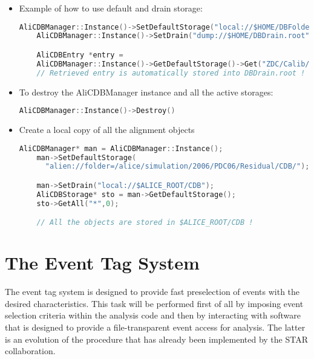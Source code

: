 \documentclass[12pt,a4paper,twoside]{article}
\begin{document}
{\begin{itemize}
  \begin{lstlisting}[language=C++]
    Bool_t 	IsDefaultStorageSet()
    void	RemoveDefaultStorage()
    Bool_t 	IsDrainSet()
    void	RemoveDrain()
  \end{lstlisting}

\item Example of how to use default and drain storage:

  \begin{lstlisting}[language=C++]
    AliCDBManager::Instance()->SetDefaultStorage("local://$HOME/DBFolder");
    AliCDBManager::Instance()->SetDrain("dump://$HOME/DBDrain.root");

    AliCDBEntry *entry = 
    AliCDBManager::Instance()->GetDefaultStorage()->Get("ZDC/Calib/Pedestals",5)
    // Retrieved entry is automatically stored into DBDrain.root !
  \end{lstlisting}

\item To destroy the AliCDBManager instance and all the active storages:

  \begin{lstlisting}[language=C++]
    AliCDBManager::Instance()->Destroy()
  \end{lstlisting}

 \item Create a local copy of all the alignment objects

  \begin{lstlisting}[language=C++]
    AliCDBManager* man = AliCDBManager::Instance();
    man->SetDefaultStorage(
      "alien://folder=/alice/simulation/2006/PDC06/Residual/CDB/");

    man->SetDrain("local://$ALICE_ROOT/CDB");
    AliCDBStorage* sto = man->GetDefaultStorage();
    sto->GetAll("*",0);

    // All the objects are stored in $ALICE_ROOT/CDB !
  \end{lstlisting}

\end{itemize}

\newpage
\section{The Event Tag System}

The event tag system \cite{EventTag} is designed to provide fast
preselection of 
events with the desired characteristics. This task will be performed
first of all by imposing event selection criteria within the analysis
code and then by interacting with software that is designed to provide
a file-transparent event access for analysis. The latter is an
evolution of the procedure that has already been implemented by the
STAR \cite{STAR} collaboration. 

}
\end{document}
